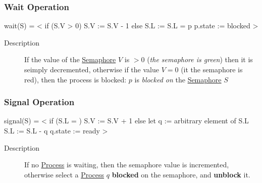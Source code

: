 \subsubsection{Wait Operation}\label{sub:pi_wait_operation} %
\begin{codeblock}{}
    wait(S) =
    < if (S.V > 0)
        S.V := S.V - 1
    else
        S.L := S.L = {p}
        p.state := blocked >
\end{codeblock}
\begin{description}
    \item[Description] If the value of the \hyperref[def:semaphore]{Semaphore} $V$ is $> 0$ (\textit{the semaphore is green}) then it is seimply decremented, otherwise if the value $V = 0$ (it the semaphore is red), then the process is blocked: $p$ is \textit{blocked on} the \hyperref[def:semaphore]{Semaphore} $S$
    \begin{note}
    \end{note}
\end{description}
%
\subsubsection{Signal Operation}\label{sub:pi_signal_operation} %
\begin{codeblock}{}
    signal(S) =
    < if (S.L = {})
        S.V := S.V + 1
    else
        let q := arbitrary element of S.L
        S.L := S.L - {q}
        q.state := ready >
\end{codeblock}
\begin{description}
    \item[Description] If no \hyperref[def:process]{Process} is waiting, then the semaphore value is incremented, otherwise select a \hyperref[def:process]{Process} $q$ \textbf{blocked} on the semaphore, and \textbf{unblock} it.
\end{description}
\begin{note}
\end{note}
%
